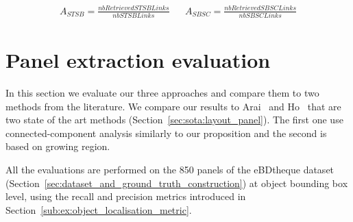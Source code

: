 \begin{align}
\label{eq:ex:accuracy_semantic_links}
A_{STSB} = \frac{nbRetrievedSTSBLinks}{nbSTSBLinks} && A_{SBSC} = \frac{nbRetrievedSBSCLinks}{nbSBSCLinks}
\end{align}








\section{Panel extraction evaluation} %
\label{sub:ex:panel_extraction_evaluation}

In this section we evaluate our three approaches  and compare them to two methods from the literature.
We compare our results to Arai~\cite{Arai10} and Ho~\cite{Ho2012} that are two state of the art methods (Section~\ref{sec:sota:layout_panel}).
The first one use connected-component analysis similarly to our proposition and the second is based on growing region.

All the evaluations are performed on the 850 panels of the eBDtheque dataset (Section~\ref{sec:dataset_and_ground_truth_construction}) at object bounding box level, using the recall and precision metrics introduced in Section~\ref{sub:ex:object_localisation_metric}.

